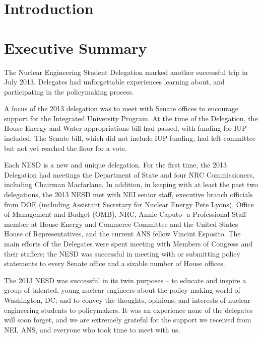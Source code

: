 \documentclass[12pt]{article}
\begin{document}


\newpage
\tableofcontents
\thispagestyle{empty}

\newpage
\setcounter{page}{1} 
\section{Introduction}


\section{Executive Summary}

The Nuclear Engineering Student Delegation marked another successful trip in
July 2013.  Delegates had unforgettable experiences learning about, and
participating in the policymaking process.

A focus of the 2013 delegation was to meet with Senate offices to encourage
support for the Integrated University Program.  At the time of the Delegation,
the House Energy and Water appropriations bill had passed, with funding for IUP
included.  The Senate bill, which did not include IUP funding, had left
committee but not yet reached the floor for a vote.

Each NESD is a new and unique delegation. For the first time, the 2013
Delegation had meetings the Department of State and four NRC Commissioners,
including Chairman Macfarlane.  In addition, in keeping with at least the past
two delegations, the 2013 NESD met with NEI senior staff, executive branch
officials from DOE (including Assistant Secretary for Nuclear Energy Pete
Lyons), Office of Management and Budget (OMB), NRC, Annie Caputo- a Professional
Staff member at House Energy and Commerce Committee and the United States House
of Representatives, and the current ANS fellow Vincint Esposito.  The main
efforts of the Delegates were spent meeting with Members of Congress and their
staffers; the NESD was successful in meeting with or submitting policy
statements to every Senate office and a sizable number of House offices.

The 2013 NESD was successful in its twin purposes – to educate and inspire a
group of talented, young nuclear engineers about the policy-making world of
Washington, DC; and to convey the thoughts, opinions, and interests of nuclear
engineering students to policymakers.  It was an experience none of the
delegates will soon forget, and we are extremely grateful for the support we
received from NEI, ANS, and everyone who took time to meet with us.
\end{document}
